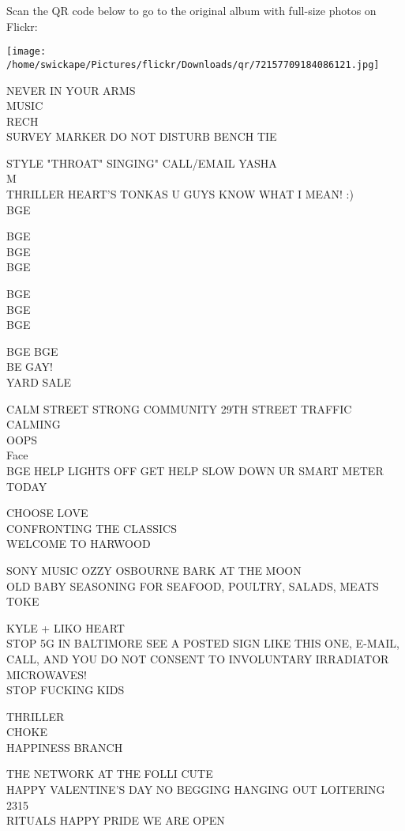 \documentclass[10pt,letterpaper]{article}
\begin{document}
Scan the QR code below to go to the original album with full-size photos on Flickr:

\texttt{[image: /home/swickape/Pictures/flickr/Downloads/qr/72157709184086121.jpg]}
\pagebreak

NEVER IN YOUR ARMS\\
MUSIC\\
RECH\\
SURVEY MARKER DO NOT DISTURB BENCH TIE

STYLE "THROAT" SINGING" CALL/EMAIL YASHA\\
M\\
THRILLER HEART'S TONKAS U GUYS KNOW WHAT I MEAN!  :)\\
BGE

BGE\\
BGE\\
BGE

BGE\\
BGE\\
BGE

BGE BGE\\
BE GAY!\\
YARD SALE

CALM STREET STRONG COMMUNITY 29TH STREET TRAFFIC CALMING\\
OOPS\\
Face\\
BGE HELP LIGHTS OFF GET HELP SLOW DOWN UR SMART METER TODAY

CHOOSE LOVE\\
CONFRONTING THE CLASSICS\\
WELCOME TO HARWOOD

SONY MUSIC OZZY OSBOURNE BARK AT THE MOON\\
OLD BABY SEASONING FOR SEAFOOD, POULTRY, SALADS, MEATS\\
TOKE

KYLE + LIKO HEART\\
STOP 5G IN BALTIMORE SEE A POSTED SIGN LIKE THIS ONE, E{-}MAIL, CALL, AND YOU DO NOT CONSENT TO INVOLUNTARY IRRADIATOR MICROWAVES!\\
STOP FUCKING KIDS

THRILLER\\
CHOKE\\
HAPPINESS BRANCH

THE NETWORK AT THE FOLLI CUTE\\
HAPPY VALENTINE'S DAY NO BEGGING HANGING OUT LOITERING\\
2315\\
RITUALS HAPPY PRIDE WE ARE OPEN
\end{document}

